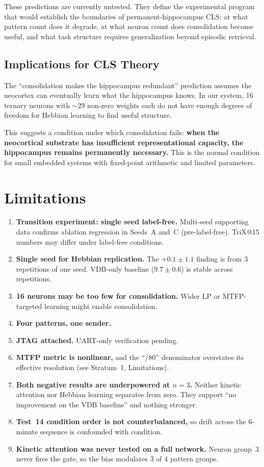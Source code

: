 \documentclass[11pt,letterpaper]{article}
\begin{document}
These predictions are currently untested. They define the experimental program that would establish the boundaries of permanent-hippocampus CLS: at what pattern count does it degrade, at what neuron count does consolidation become useful, and what task structure requires generalization beyond episodic retrieval.

\subsection{Implications for CLS Theory}

The ``consolidation makes the hippocampus redundant'' prediction assumes the neocortex can eventually learn what the hippocampus knows. In our system, 16 ternary neurons with $\sim$29 non-zero weights each do not have enough degrees of freedom for Hebbian learning to find useful structure.

This suggests a condition under which consolidation fails: \textbf{when the neocortical substrate has insufficient representational capacity, the hippocampus remains permanently necessary.} This is the normal condition for small embedded systems with fixed-point arithmetic and limited parameters.

\section{Limitations}

\begin{enumerate}
\item \textbf{Transition experiment: single seed label-free.} Multi-seed supporting data confirms ablation regression in Seeds~A and~C (pre-label-free). TriX@15 numbers may differ under label-free conditions.
\item \textbf{Single seed for Hebbian replication.} The $+0.1 \pm 1.1$ finding is from 3 repetitions of one seed. VDB-only baseline ($9.7 \pm 0.6$) is stable across repetitions.
\item \textbf{16 neurons may be too few for consolidation.} Wider LP or MTFP-targeted learning might enable consolidation.
\item \textbf{Four patterns, one sender.}
\item \textbf{JTAG attached.} UART-only verification pending.
\item \textbf{MTFP metric is nonlinear,} and the ``/80'' denominator overstates its effective resolution (see Stratum~1, Limitations).
\item \textbf{Both negative results are underpowered at $n=3$.} Neither kinetic attention nor Hebbian learning separates from zero. They support ``no improvement on the VDB baseline'' and nothing stronger.
\item \textbf{Test~14 condition order is not counterbalanced,} so drift across the 6-minute sequence is confounded with condition.
\item \textbf{Kinetic attention was never tested on a full network.} Neuron group~3 never fires the gate, so the bias modulates 3 of 4 pattern groups.
\end{enumerate}
\end{document}
